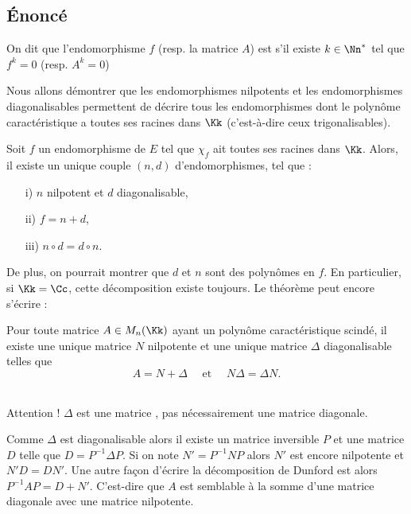 \documentclass[12pt, class=report,crop=false]{standalone}
\begin{document}
\subsection{\'Enoncé}

\begin{definition}
On dit que l'endomorphisme $f$ (resp. la matrice $A$) 
est  s'il existe $k\in\Nn^*$ tel
que $f^k=0$ (resp. $A^k=0$)
\end{definition} 



Nous allons démontrer que les endomorphismes nilpotents et 
les endomorphismes diagonalisables permettent de décrire tous les 
endomorphismes dont le polynôme 
caractéristique a toutes ses racines dans $\Kk$ (c'est-à-dire ceux trigonalisables). 



\begin{theoreme}
\label{th:dunford1}
Soit $f$ un endomorphisme de $E$ tel que $\chi_f$ ait toutes ses racines dans $\Kk$. 
Alors, il existe un unique couple $(n,d)$ d'endomorphismes, tel que : 
\begin{itemize}
  \item[i)] $n$ nilpotent et $d$ diagonalisable,
  \item[ii)] $f=n+d$,
  \item[iii)] $n\circ d=d\circ n$.   
\end{itemize}
\end{theoreme}

De plus, on pourrait montrer que $d$ et $n$ sont des polynômes en $f$.
En particulier, si $\Kk=\Cc$, cette décomposition existe toujours.
Le théorème peut encore s'écrire :

\begin{theoreme}
\label{th:dunford2}
Pour toute matrice $A\in M_n(\Kk)$ ayant un polynôme caractéristique scindé, il existe une 
unique matrice $N$ nilpotente et une unique matrice $\Delta$ diagonalisable telles que 
$$A=N+\Delta \quad \text{ et } \quad N\Delta=\Delta N.$$
\end{theoreme} 
 
\bigskip 
 
 \\
Attention ! $\Delta$ est une matrice , pas nécessairement une matrice diagonale.

Comme $\Delta$ est diagonalisable alors il existe un matrice inversible $P$ et une matrice  $D$ telle que $D = P^{-1}\Delta P$. Si on note $N' = P^{-1}NP$ alors $N'$ est encore nilpotente et $N' D= DN'$. Une autre façon d'écrire la décomposition de Dunford est alors $P^{-1}AP = D + N'$. C'est-dire que $A$ est semblable à la somme d'une matrice diagonale avec une matrice nilpotente.
 
\end{document}
